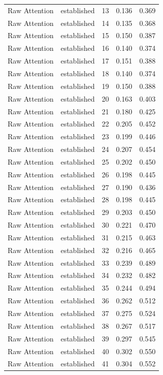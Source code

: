 \begin{tabular}{llrrr}
Raw Attention & established & 13 & 0.136 & 0.369 \\
Raw Attention & established & 14 & 0.135 & 0.368 \\
Raw Attention & established & 15 & 0.150 & 0.387 \\
Raw Attention & established & 16 & 0.140 & 0.374 \\
Raw Attention & established & 17 & 0.151 & 0.388 \\
Raw Attention & established & 18 & 0.140 & 0.374 \\
Raw Attention & established & 19 & 0.150 & 0.388 \\
Raw Attention & established & 20 & 0.163 & 0.403 \\
Raw Attention & established & 21 & 0.180 & 0.425 \\
Raw Attention & established & 22 & 0.205 & 0.452 \\
Raw Attention & established & 23 & 0.199 & 0.446 \\
Raw Attention & established & 24 & 0.207 & 0.454 \\
Raw Attention & established & 25 & 0.202 & 0.450 \\
Raw Attention & established & 26 & 0.198 & 0.445 \\
Raw Attention & established & 27 & 0.190 & 0.436 \\
Raw Attention & established & 28 & 0.198 & 0.445 \\
Raw Attention & established & 29 & 0.203 & 0.450 \\
Raw Attention & established & 30 & 0.221 & 0.470 \\
Raw Attention & established & 31 & 0.215 & 0.463 \\
Raw Attention & established & 32 & 0.216 & 0.465 \\
Raw Attention & established & 33 & 0.239 & 0.489 \\
Raw Attention & established & 34 & 0.232 & 0.482 \\
Raw Attention & established & 35 & 0.244 & 0.494 \\
Raw Attention & established & 36 & 0.262 & 0.512 \\
Raw Attention & established & 37 & 0.275 & 0.524 \\
Raw Attention & established & 38 & 0.267 & 0.517 \\
Raw Attention & established & 39 & 0.297 & 0.545 \\
Raw Attention & established & 40 & 0.302 & 0.550 \\
Raw Attention & established & 41 & 0.304 & 0.552 \\

\end{tabular}

